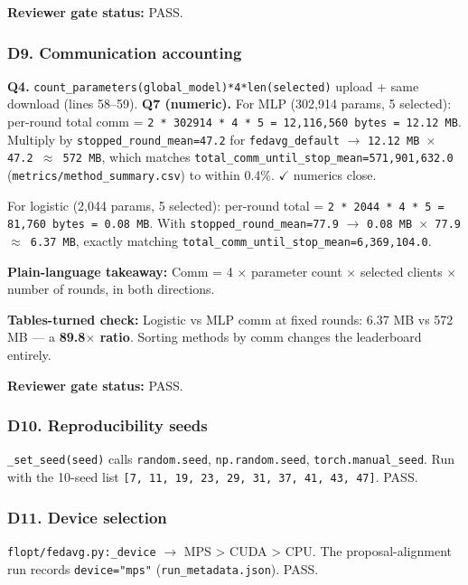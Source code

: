\documentclass{article}
\begin{document}
\textbf{Reviewer gate status:} PASS.


\subsubsection{D9. Communication accounting}


\textbf{Q4.} \texttt{count\_parameters(global\_model)*4*len(selected)} upload + same download (lines 58--59). \textbf{Q7 (numeric).} For MLP (302,914 params, 5 selected): per-round total comm = \texttt{2 * 302914 * 4 * 5 = 12,116,560 bytes = 12.12 MB}. Multiply by \texttt{stopped\_round\_mean=47.2} for \texttt{fedavg\_default} \ensuremath{\rightarrow} \texttt{12.12 MB \ensuremath{\times} 47.2 \ensuremath{\approx} 572 MB}, which matches \texttt{total\_comm\_until\_stop\_mean=571,901,632.0} (\texttt{metrics/method\_summary.csv}) to within 0.4\%. \ensuremath{\checkmark} numerics close.


For logistic (2,044 params, 5 selected): per-round total = \texttt{2 * 2044 * 4 * 5 = 81,760 bytes = 0.08 MB}. With \texttt{stopped\_round\_mean=77.9} \ensuremath{\rightarrow} \texttt{0.08 MB \ensuremath{\times} 77.9 \ensuremath{\approx} 6.37 MB}, exactly matching \texttt{total\_comm\_until\_stop\_mean=6,369,104.0}.


\textbf{Plain-language takeaway:} Comm = 4 \ensuremath{\times} parameter count \ensuremath{\times} selected clients \ensuremath{\times} number of rounds, in both directions.


\textbf{Tables-turned check:} Logistic vs MLP comm at fixed rounds: 6.37 MB vs 572 MB --- a \textbf{89.8\ensuremath{\times} ratio}. Sorting methods by comm changes the leaderboard entirely.


\textbf{Reviewer gate status:} PASS.


\subsubsection{D10. Reproducibility seeds}


\texttt{\_set\_seed(seed)} calls \texttt{random.seed}, \texttt{np.random.seed}, \texttt{torch.manual\_seed}. Run with the 10-seed list \texttt{[7, 11, 19, 23, 29, 31, 37, 41, 43, 47]}. PASS.


\subsubsection{D11. Device selection}


\texttt{flopt/fedavg.py:\_device} \ensuremath{\rightarrow} MPS > CUDA > CPU. The proposal-alignment run records \texttt{device="mps"} (\texttt{run\_metadata.json}). PASS.
\end{document}
